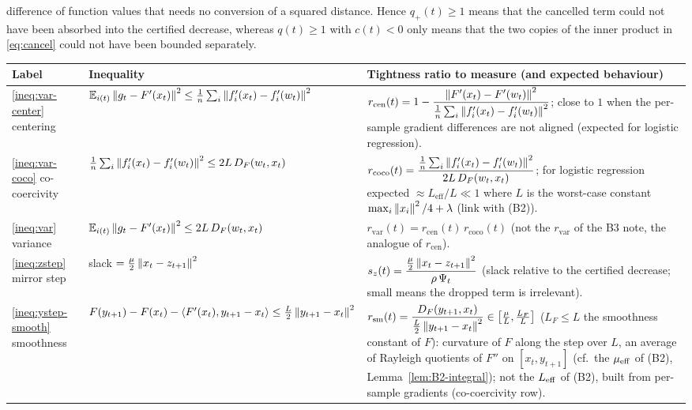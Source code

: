 difference of function values that needs no conversion of a squared distance. Hence $q_+(t)\ge1$ means that the cancelled term could not have been absorbed into the certified decrease, whereas $q(t)\ge1$ with $c(t)<0$ only means that the two copies of the inner product in \eqref{eq:cancel} could not have been bounded separately.

\begin{table}[htbp]
\centering\small
\begin{tabular}{p{2.2cm}p{5.6cm}p{7.3cm}}
\hline
Label & Inequality & Tightness ratio to measure (and expected behaviour) \\
\hline
\eqref{ineq:var-center} centering & $\mathbb{E}_{i(t)}\left\|g_t-F'(x_t)\right\|^2\le\frac1n\sum_i\left\|f'_i(x_t)-f'_i(w_t)\right\|^2$ & $r_{\mathrm{cen}}(t)=1-\dfrac{\left\|F'(x_t)-F'(w_t)\right\|^2}{\frac1n\sum_i\left\|f'_i(x_t)-f'_i(w_t)\right\|^2}$; close to $1$ when the per-sample gradient differences are not aligned (expected for logistic regression). \\
\eqref{ineq:var-coco} co-coercivity & $\frac1n\sum_i\left\|f'_i(x_t)-f'_i(w_t)\right\|^2\le2L\,D_F(w_t,x_t)$ & $r_{\mathrm{coco}}(t)=\dfrac{\frac1n\sum_i\left\|f'_i(x_t)-f'_i(w_t)\right\|^2}{2L\,D_F(w_t,x_t)}$; for logistic regression expected $\approx L_{\mathrm{eff}}/L\ll1$ where $L$ is the worst-case constant $\max_i\left\|x_i\right\|^2/4+\lambda$ (link with (B2)). \\
\eqref{ineq:var} variance & $\mathbb{E}_{i(t)}\left\|g_t-F'(x_t)\right\|^2\le2L\,D_F(w_t,x_t)$ & $r_{\mathrm{var}}(t)=r_{\mathrm{cen}}(t)\,r_{\mathrm{coco}}(t)$ (not the $r_{\mathrm{var}}$ of the B3 note, the analogue of $r_{\mathrm{cen}}$). \\
\eqref{ineq:zstep} mirror step & slack $=\frac\mu2\left\|x_t-z_{t+1}\right\|^2$ & $s_z(t)=\dfrac{\frac\mu2\left\|x_t-z_{t+1}\right\|^2}{\rho\,\Psi_t}$ (slack relative to the certified decrease; small means the dropped term is irrelevant). \\
\eqref{ineq:ystep-smooth} smoothness & $F(y_{t+1})-F(x_t)-\left\langle F'(x_t), y_{t+1}-x_t \right\rangle\le\frac L2\left\|y_{t+1}-x_t\right\|^2$ & $r_{\mathrm{sm}}(t)=\dfrac{D_F(y_{t+1},x_t)}{\frac L2\left\|y_{t+1}-x_t\right\|^2}\in\big[\frac\mu L,\frac{L_F}L\big]$ ($L_F\le L$ the smoothness constant of $F$): curvature of $F$ along the step over $L$, an average of Rayleigh quotients of $F''$ on $[x_t,y_{t+1}]$ (cf.\ the $\mu_{\mathrm{eff}}$ of (B2), Lemma~\ref{lem:B2-integral}); not the $L_{\mathrm{eff}}$ of (B2), built from per-sample gradients (co-coercivity row). \\

\end{tabular}
\end{table}
